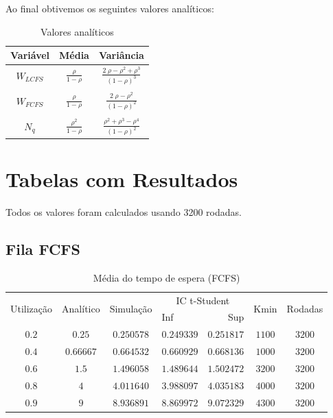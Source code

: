 \documentclass[a4paper]{article}
\begin{document}
Ao final obtivemos os seguintes valores analíticos:
\begin{table}[h]
    \centering
    \begin{tabular}{|c|cc|}\hline
        Variável & Média & Variância \\\hline
        $ W_{LCFS} $&$ \frac{\rho}{1-\rho} $&$
            \frac{2 \; \rho - \rho^2 + \rho^3}{(1-\rho)^3} $\\&&\\
        $ W_{FCFS} $&$ \frac{\rho}{1-\rho} $&$
            \frac{2 \; \rho - \rho^2}{(1 - \rho)^2} $\\&&\\
        $ N_q      $&$ \frac{\rho^2}{1 - \rho} $&$
            \frac{\rho^2 + \rho^3 - \rho^4}{(1 - \rho)^2} $\\\hline
    \end{tabular}
    \caption{Valores analíticos}
\end{table}

\newpage
\section{Tabelas com Resultados}
Todos os valores foram calculados usando 3200 rodadas.

\subsection{Fila FCFS}
\begin{table}[h!]
    \centering
    \begin{tabular}{|c|c|c|lr|c|c|}\hline
        \multirow{2}{4.35em}{Utilização}
            & \multirow{2}{3.95em}{Analítico}
            & \multirow{2}{4.4em}{Simulação}
            & \multicolumn{2}{|c|}{IC t-Student}
            & \multirow{2}{2.4em}{Kmin}
            & \multirow{2}{3.75em}{Rodadas} \\
        &&& Inf & Sup &&\\\hline
        $ 0.2 $&$ 0.25 $&$ 0.250578 $&$ 0.249339 $&$ 0.251817 $&$
            1100 $&$ 3200 $\\\hline
        $ 0.4 $&$ 0.66667 $&$ 0.664532 $&$ 0.660929 $&$ 0.668136 $&$
            1000 $&$ 3200 $\\\hline
        $ 0.6 $&$ 1.5 $&$ 1.496058 $&$ 1.489644 $&$ 1.502472 $&$
            3200 $&$ 3200 $\\\hline
        $ 0.8 $&$ 4 $&$ 4.011640 $&$ 3.988097 $&$ 4.035183 $&$
            4000 $&$ 3200 $\\\hline
        $ 0.9 $&$ 9 $&$ 8.936891 $&$ 8.869972 $&$ 9.072329 $&$
            4300 $&$ 3200 $\\\hline
    \end{tabular}
    \caption{Média do tempo de espera (FCFS)}
\end{table}
\end{document}
